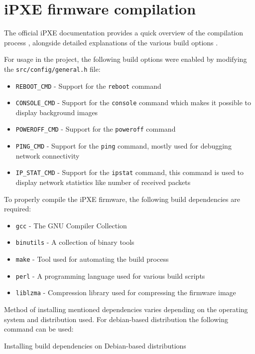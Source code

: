\documentclass[../main.tex]{subfiles}
\begin{document}
\section{iPXE firmware compilation}

The official iPXE documentation provides a quick overview of the compilation process \cite{ipxe_compilation_guide},
alongside detailed explanations of the various build options \cite{ipxe_build_options}.

For usage in the project, the following build options were enabled by modifying the \texttt{src/config/general.h} file:

\begin{itemize}
  \item \texttt{REBOOT\_CMD}   - Support for the \texttt{reboot} command
  \item \texttt{CONSOLE\_CMD}  - Support for the \texttt{console} command which makes it possible to display background images
  \item \texttt{POWEROFF\_CMD} - Support for the \texttt{poweroff} command
  \item \texttt{PING\_CMD}     - Support for the \texttt{ping} command, mostly used for debugging network connectivity
  \item \texttt{IP\_STAT\_CMD} - Support for the \texttt{ipstat} command, this command is used to display network statistics like number of received packets
\end{itemize}

To properly compile the iPXE firmware, the following build dependencies are required:

\begin{itemize}
  \item \texttt{gcc}      - The GNU Compiler Collection
  \item \texttt{binutils} - A collection of binary tools
  \item \texttt{make}     - Tool used for automating the build process
  \item \texttt{perl}     - A programming language used for various build scripts
  \item \texttt{liblzma}  - Compression library used for compressing the firmware image
\end{itemize}

Method of installing mentioned dependencies varies depending on the operating system and distribution used.
For debian-based distribution the following command can be used:

\begin{listing}[H]

  \caption{Installing build dependencies on Debian-based distributions}
\end{listing}
\end{document}
